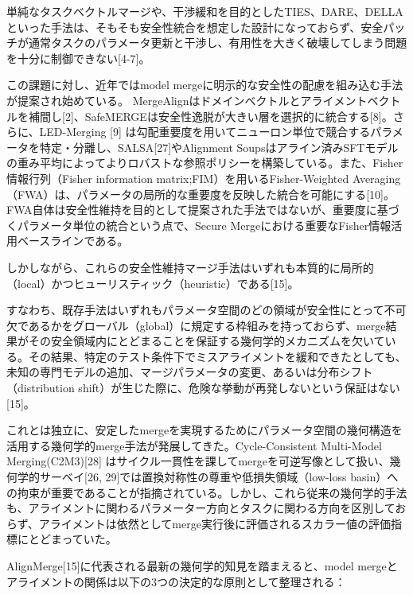 \documentclass{article}
\begin{document}
単純なタスクベクトルマージや、干渉緩和を目的としたTIES、DARE、DELLAといった手法は、そもそも安全性統合を想定した設計になっておらず、安全パッチが通常タスクのパラメータ更新と干渉し、有用性を大きく破壊してしまう問題を十分に制御できない[4-7]。

この課題に対し、近年ではmodel mergeに明示的な安全性の配慮を組み込む手法が提案され始めている。
MergeAlignはドメインベクトルとアライメントベクトルを補間し[2]、SafeMERGEは安全性逸脱が大きい層を選択的に統合する[8]。さらに、LED-Merging [9] は勾配重要度を用いてニューロン単位で競合するパラメータを特定・分離し、SALSA[27]やAlignment Soupsはアライン済みSFTモデルの重み平均によってよりロバストな参照ポリシーを構築している。また、Fisher情報行列（Fisher information matrix;FIM）を用いるFisher-Weighted Averaging（FWA）は、パラメータの局所的な重要度を反映した統合を可能にする[10]。FWA自体は安全性維持を目的として提案された手法ではないが、重要度に基づくパラメータ単位の統合という点で、Secure Mergeにおける重要なFisher情報活用ベースラインである。

しかしながら、これらの安全性維持マージ手法はいずれも本質的に局所的（local）かつヒューリスティック（heuristic）である[15]。

すなわち、既存手法はいずれもパラメータ空間のどの領域が安全性にとって不可欠であるかをグローバル（global）に規定する枠組みを持っておらず、merge結果がその安全領域内にとどまることを保証する幾何学的メカニズムを欠いている。その結果、特定のテスト条件下でミスアライメントを緩和できたとしても、未知の専門モデルの追加、マージパラメータの変更、あるいは分布シフト（distribution shift）が生じた際に、危険な挙動が再発しないという保証はない[15]。

これとは独立に、安定したmergeを実現するためにパラメータ空間の幾何構造を活用する幾何学的merge手法が発展してきた。Cycle-Consistent Multi-Model Merging(C2M3)[28] はサイクル一貫性を課してmergeを可逆写像として扱い、幾何学的サーベイ[26, 29]では置換対称性の尊重や低損失領域（low-loss basin）への拘束が重要であることが指摘されている。しかし、これら従来の幾何学的手法も、アライメントに関わるパラメーター方向とタスクに関わる方向を区別しておらず、アライメントは依然としてmerge実行後に評価されるスカラー値の評価指標にとどまっていた。

AlignMerge[15]に代表される最新の幾何学的知見を踏まえると、model mergeとアライメントの関係は以下の3つの決定的な原則として整理される：
\end{document}
